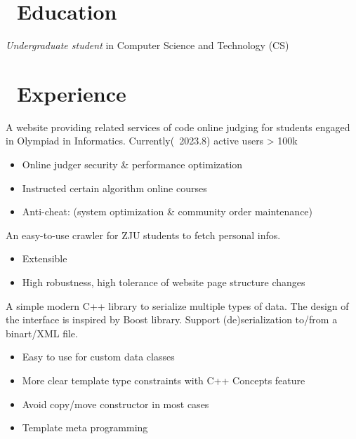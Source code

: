 \documentclass{resume}
\begin{document}



\section{\faGraduationCap\ Education}
\textit{Undergraduate student} in Computer Science and Technology (CS)

\section{\faUsers\ Experience}
A website providing related services of code online judging for students engaged in Olympiad in Informatics.  
Currently(~2023.8) active users > 100k
\begin{itemize}
  \item Online judger security \& performance optimization
  \item Instructed certain algorithm online courses
  \item Anti-cheat: (system optimization \& community order maintenance)
\end{itemize}

An easy-to-use crawler for ZJU students to fetch personal infos.  
\begin{itemize}
  \item Extensible
  \item High robustness, high tolerance of website page structure changes
\end{itemize}

A simple modern C++ library to serialize multiple types of data. The design of the interface is inspired by Boost library.
Support (de)serialization to/from a binart/XML file.
\begin{itemize}
  \item Easy to use for custom data classes
  \item More clear template type constraints with C++ Concepts feature
  \item Avoid copy/move constructor in most cases
  \item Template meta programming
\end{itemize}
\end{document}
